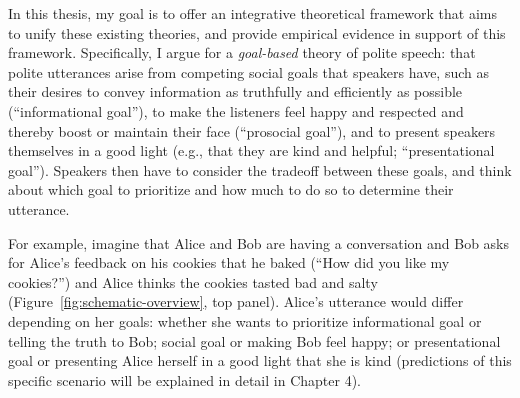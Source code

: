 \documentclass[oneside]{report}
\begin{document}
In this thesis, my goal is to offer an integrative theoretical framework
that aims to unify these existing theories, and provide empirical
evidence in support of this framework. Specifically, I argue for a
\emph{goal-based} theory of polite speech: that polite utterances arise
from competing social goals that speakers have, such as their desires to
convey information as truthfully and efficiently as possible
(``informational goal''), to make the listeners feel happy and respected
and thereby boost or maintain their face (``prosocial goal''), and to
present speakers themselves in a good light (e.g., that they are kind
and helpful; ``presentational goal''). Speakers then have to consider
the tradeoff between these goals, and think about which goal to
prioritize and how much to do so to determine their utterance.

For example, imagine that Alice and Bob are having a conversation and
Bob asks for Alice's feedback on his cookies that he baked (``How did
you like my cookies?'') and Alice thinks the cookies tasted bad and
salty (Figure~\ref{fig:schematic-overview}, top panel). Alice's
utterance would differ depending on her goals: whether she wants to
prioritize informational goal or telling the truth to Bob; social goal
or making Bob feel happy; or presentational goal or presenting Alice
herself in a good light that she is kind (predictions of this specific
scenario will be explained in detail in Chapter 4).
\end{document}
